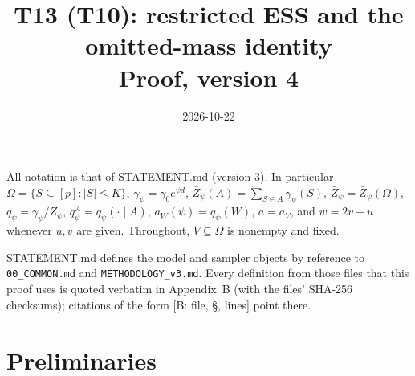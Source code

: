 \documentclass[11pt]{article}
\title{T13 (T10): restricted ESS and the omitted-mass identity\\ \large Proof, version 4}
\date{2026-10-22}
\theoremstyle{remark}
\newcommand{\Zb}{\bar Z}
\begin{document}
\maketitle

All notation is that of STATEMENT.md (version 3). In particular $\Omega=\{S\subseteq[p]:|S|\le K\}$, $\gamma_\psi=\gamma_0e^{\psi d}$, $\Zb_\psi(A)=\sum_{S\in A}\gamma_\psi(S)$, $\Zb_\psi=\Zb_\psi(\Omega)$, $q_\psi=\gamma_\psi/\Zb_\psi$, $q_\psi^A=q_\psi(\cdot\mid A)$, $a_W(\psi)=q_\psi(W)$, $a=a_V$, and $w=2v-u$ whenever $u,v$ are given. Throughout, $V\subseteq\Omega$ is nonempty and fixed.

STATEMENT.md defines the model and sampler objects by reference to \texttt{00\_COMMON.md} and \texttt{METHODOLOGY\_v3.md}. Every definition from those files that this proof uses is quoted verbatim in Appendix~B (with the files' SHA-256 checksums); citations of the form [B: file, \S, lines] point there.

\section{Preliminaries}
\end{document}
